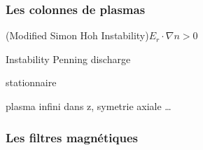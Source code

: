 \begin{refsection}
\subsubsection{Les colonnes de plasmas}
\parencite{RosenbluthSimon}

\parencite{Sakawa} (Modified Simon Hoh Instability)$E_r\cdot\nabla n > 0$

\parencite{Hoh} Instability Penning discharge

\parencite{Fruchtman} stationnaire

\parencite{Sternberg} plasma infini dans z, symetrie axiale \ldots 

\subsubsection{Les filtres magnétiques}

\parencite{Rosenbluth}\parencite{Chandrasekhar}
%
%
\end{refsection}

